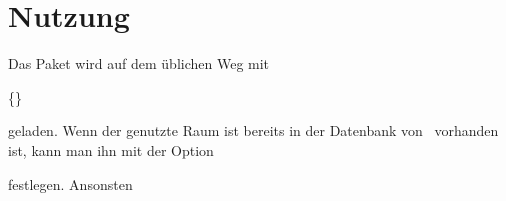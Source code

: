 \documentclass[
babel=ngerman
]{skdoc}
\begin{document}
\section{Nutzung}
Das Paket wird auf dem üblichen Weg mit

\centerline{\{\thepkg\}}

geladen.
Wenn der genutzte Raum ist bereits in der Datenbank von \thepkg\ vorhanden ist,
kann man ihn mit der Option

festlegen.
Ansonsten
\end{document}
